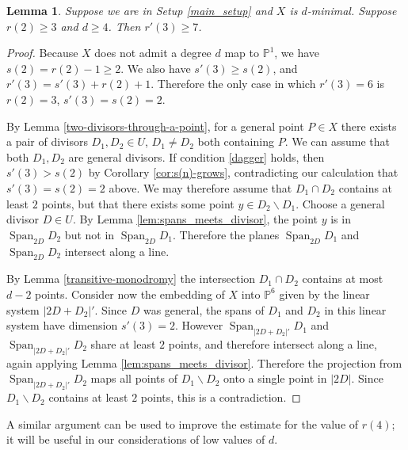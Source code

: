 \documentclass[11pt]{amsart}
\newcommand{\PP}{\mathbb{P}}
\newcommand{\pp}{\mathbb{P}}
\newcommand{\Span}{\operatorname{Span}}
\newtheorem{lemma}[theorem]{Lemma}
\theoremstyle{definition}
\theoremstyle{remark}
\begin{document}
\begin{lemma}\label{genus-fix-1}
Suppose we are in Setup \ref{main_setup} and $X$ is $d$-minimal. Suppose $r(2)\geqslant 3$ and $d \geqslant 4$. Then $r'(3) \geqslant 7$.
\end{lemma}
\begin{proof}
Because \(X\) does not admit a degree \(d\) map to \(\pp^1\), we have \(s(2)=r(2)-1 \geqslant 2\).  We also have $s'(3) \geqslant s(2)$, and $r'(3)=s'(3)+r(2)+1$. Therefore the only case in which $r'(3)=6$ is $r(2)=3$, $s'(3)=s(2)=2$.

By Lemma \ref{two-divisors-through-a-point}, for a general point $P \in X$ there exists a pair of divisors $D_1, D_2 \in U$, $D_1 \neq D_2$ both containing $P$. We can assume that both $D_1, D_2$ are general divisors. If condition \eqref{dagger} holds, then $s'(3)> s(2)$ by Corollary \ref{cor:s(n)-grows}, contradicting our calculation that \(s'(3)=s(2) =2\) above.  We may therefore assume that $D_1 \cap D_2$ contains at least $2$ points, but that there exists some point \(y \in D_2 \smallsetminus D_1\). Choose a general divisor $D \in U$. By Lemma \ref{lem:spans_meets_divisor}, the point \(y\) is in \(\Span_{2D}D_2\) but not in $\Span_{2D}D_1$. Therefore the planes $\Span_{2D} D_1$ and $\Span_{2D}D_2$ intersect along a line.

 By Lemma \ref{transitive-monodromy} the intersection $D_1 \cap D_2$ contains at most $d-2$ points.  Consider now the embedding of $X$ into $\PP^6$ given by the linear system $|2D+D_2|'$. Since $D$ was general, the spans of $D_1$ and $D_2$ in this linear system have dimension $s'(3)=2$. However $\Span_{|2D+D_2|'}D_1$ and $\Span_{|2D+D_2|'} D_2$ share at least $2$ points, and therefore intersect along a line, again applying Lemma \ref{lem:spans_meets_divisor}.  Therefore the projection from $\Span_{|2D+D_2|'}D_2$ maps all points of $D_1 \smallsetminus D_2$ onto a single point in $|2D|$. Since $D_1 \smallsetminus D_2$ contains at least $2$ points, this is a contradiction.
\end{proof}

A similar argument can be used to improve the estimate for the value of $r(4)$; it will be useful in our considerations of low values of $d$.
\end{document}
